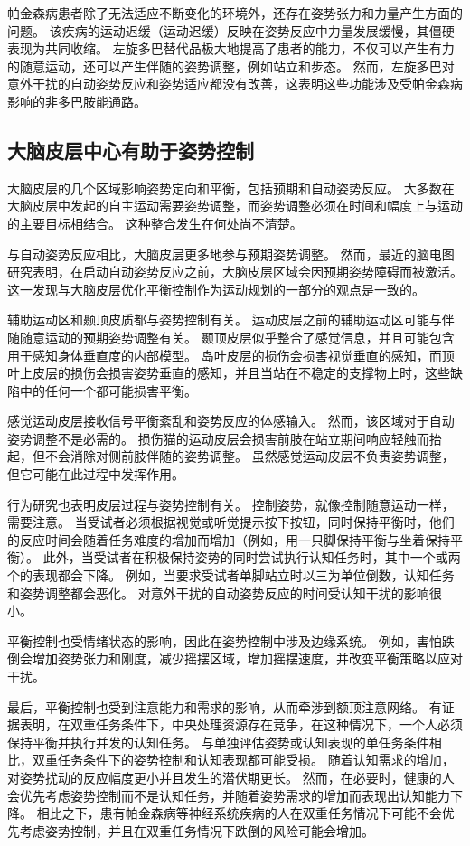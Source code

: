 帕金森病患者除了无法适应不断变化的环境外，还存在姿势张力和力量产生方面的问题。
该疾病的运动迟缓（运动迟缓）反映在姿势反应中力量发展缓慢，其僵硬表现为共同收缩。
左旋多巴替代品极大地提高了患者的能力，不仅可以产生有力的随意运动，还可以产生伴随的姿势调整，例如站立和步态。
然而，左旋多巴对意外干扰的自动姿势反应和姿势适应都没有改善，这表明这些功能涉及受帕金森病影响的非多巴胺能通路。


\subsection{大脑皮层中心有助于姿势控制}

大脑皮层的几个区域影响姿势定向和平衡，包括预期和自动姿势反应。
大多数在大脑皮层中发起的自主运动需要姿势调整，而姿势调整必须在时间和幅度上与运动的主要目标相结合。
这种整合发生在何处尚不清楚。


与自动姿势反应相比，大脑皮层更多地参与预期姿势调整。
然而，最近的脑电图研究表明，在启动自动姿势反应之前，大脑皮层区域会因预期姿势障碍而被激活。
这一发现与大脑皮层优化平衡控制作为运动规划的一部分的观点是一致的。


辅助运动区和颞顶皮质都与姿势控制有关。
运动皮层之前的辅助运动区可能与伴随随意运动的预期姿势调整有关。
颞顶皮层似乎整合了感觉信息，并且可能包含用于感知身体垂直度的内部模型。
岛叶皮层的损伤会损害视觉垂直的感知，而顶叶上皮层的损伤会损害姿势垂直的感知，并且当站在不稳定的支撑物上时，这些缺陷中的任何一个都可能损害平衡。


感觉运动皮层接收信号平衡紊乱和姿势反应的体感输入。
然而，该区域对于自动姿势调整不是必需的。
损伤猫的运动皮层会损害前肢在站立期间响应轻触而抬起，但不会消除对侧前肢伴随的姿势调整。
虽然感觉运动皮层不负责姿势调整，但它可能在此过程中发挥作用。


行为研究也表明皮层过程与姿势控制有关。
控制姿势，就像控制随意运动一样，需要注意。
当受试者必须根据视觉或听觉提示按下按钮，同时保持平衡时，他们的反应时间会随着任务难度的增加而增加（例如，用一只脚保持平衡与坐着保持平衡）。
此外，当受试者在积极保持姿势的同时尝试执行认知任务时，其中一个或两个的表现都会下降。
例如，当要求受试者单脚站立时以三为单位倒数，认知任务和姿势调整都会恶化。
对意外干扰的自动姿势反应的时间受认知干扰的影响很小。


平衡控制也受情绪状态的影响，因此在姿势控制中涉及边缘系统。
例如，害怕跌倒会增加姿势张力和刚度，减少摇摆区域，增加摇摆速度，并改变平衡策略以应对干扰。


最后，平衡控制也受到注意能力和需求的影响，从而牵涉到额顶注意网络。
有证据表明，在双重任务条件下，中央处理资源存在竞争，在这种情况下，一个人必须保持平衡并执行并发的认知任务。
与单独评估姿势或认知表现的单任务条件相比，双重任务条件下的姿势控制和认知表现都可能受损。
随着认知需求的增加，对姿势扰动的反应幅度更小并且发生的潜伏期更长。
然而，在必要时，健康的人会优先考虑姿势控制而不是认知任务，并随着姿势需求的增加而表现出认知能力下降。
相比之下，患有帕金森病等神经系统疾病的人在双重任务情况下可能不会优先考虑姿势控制，并且在双重任务情况下跌倒的风险可能会增加。



